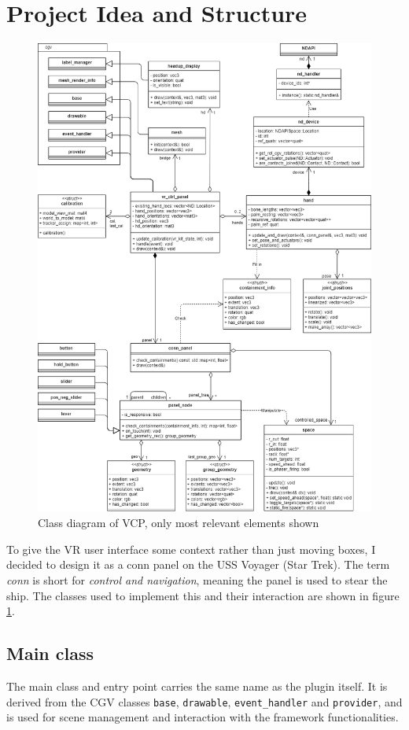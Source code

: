 \documentclass[hyperref, bachelorofscience]{cgvpub}
\begin{document}
\section{Project Idea and Structure}
\begin{figure}
	\includegraphics[width=\linewidth]{../pics/uml}
	\caption[Class diagram of \gls{VCP}]{Class diagram of \gls{VCP}, only most relevant elements shown}
	\label{fig:uml}
\end{figure}

To give the VR user interface some context rather than just moving boxes, I decided to design it as a conn panel on the USS Voyager (Star Trek). The term \emph{conn} is short for \emph{control and navigation}, meaning the panel is used to stear the ship. The classes used to implement this and their interaction are shown in figure \ref{fig:uml}.

\subsection{Main class}
The main class and entry point carries the same name as the plugin itself. It is derived from the \gls{CGV} classes \lstinline|base|, \lstinline|drawable|, \lstinline|event_handler| and \lstinline|provider|, and is used for scene management and interaction with the framework functionalities.
\end{document}
